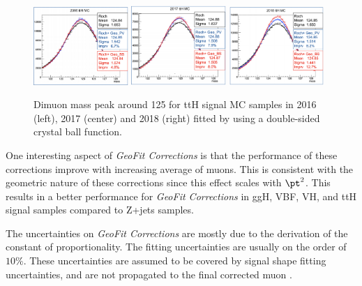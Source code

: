 \begin{figure}[h!]
    \centering
    \includegraphics[width=0.32\textwidth]{images_geofit/ttH_mass_geofit_2016.png}
    \includegraphics[width=0.32\textwidth]{images_geofit/ttH_mass_geofit_2017.png}
    \includegraphics[width=0.32\textwidth]{images_geofit/ttH_mass_geofit_2018.png}
    \caption{Dimuon mass peak around 125 \gev for ttH signal MC samples in 2016 (left), 2017 (center) and 2018 (right) fitted by using a double-sided crystal ball function.}
    \label{fig:dimu_mass_ttH}
\end{figure}

One interesting aspect of \textit{GeoFit Corrections} is that the performance of these corrections improve with increasing average \pt of muons. This is consistent with the geometric nature of these corrections since this effect scales with $\pt^2$. This results in a better performance for \textit{GeoFit Corrections} in ggH, VBF, VH, and ttH signal samples compared to Z+jets samples.

The uncertainties on \textit{GeoFit Corrections} are mostly due to the derivation of the constant of proportionality. The fitting uncertainties are usually on the order of $10\%$. These uncertainties are assumed to be covered by signal shape fitting uncertainties, and are not propagated to the final corrected muon \pt.









